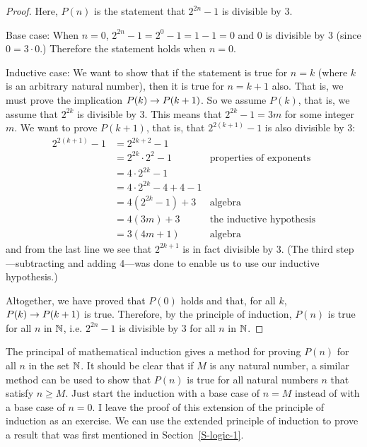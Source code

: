 \begin{proof}
Here, $P(n)$ is the statement that $2^{2n}-1$ is divisible by 3.

Base case: When $n=0$, $2^{2n}-1 = 2^0-1=1-1=0$ and $0$ is divisible by 3 
(since $0=3\cdot 0$.)  Therefore the statement holds when $n=0$.

Inductive case: We want to show that if the statement is true for $n=k$ 
(where $k$ is an arbitrary natural number),
then it is true for $n=k+1$ also.  That is, we must prove the implication
$P(k) \rightarrow P(k+1)$.  So we assume $P(k)$, that is, we assume that $2^{2k}$ is
divisible by 3.  This means that $2^{2k} -1 = 3m$ for some integer $m$.
We want to prove $P(k+1)$, that is, that $2^{2(k+1)}-1$ is also divisible by 3:
\begin{align*}
   2^{2(k+1)}-1 &= 2^{2k+2}-1 &\\
                       &= 2^{2k}\cdot2^2 - 1 &\text{properties of exponents}\\
                       &= 4\cdot 2^{2k} -1 \\
                       &= 4\cdot 2^{2k} -4 + 4 -1 \\
                       &= 4(2^{2k} -1) + 3 &\text{algebra} \\
                       &= 4(3m) + 3 & \text{the inductive hypothesis}\\
                       &= 3(4m+1) & \text{algebra}
\end{align*}
and from the last line we see that $2^{2k+1}$ is in fact divisible by 3.  (The
third step---subtracting and adding 4---was done to enable us to use our inductive
hypothesis.)

Altogether, we have proved that $P(0)$ holds and that, for all $k$, $P(k) \rightarrow
P(k+1)$ is true.  Therefore, by the principle of induction, $P(n)$ is true for
all $n$ in ${\mathbb N}$, i.e. $2^{2n}-1$ is divisible by 3 for all $n$ in ${\mathbb N}$.
\end{proof}

The principal of mathematical induction gives a method for proving $P(n)$ for
all $n$ in the set ${\mathbb N}$.  It should be clear that if $M$ is any natural number, a similar method can
be used to show that $P(n)$ is true for all natural numbers
$n$ that satisfy $n\ge M$.  Just start the induction with a base
case of $n=M$ instead of with a base case of $n=0$.  I leave the
proof of this extension of the principle of induction as an exercise.
We can use the extended principle of induction to prove a result
that was first mentioned in Section~\ref{S-logic-1}.  

